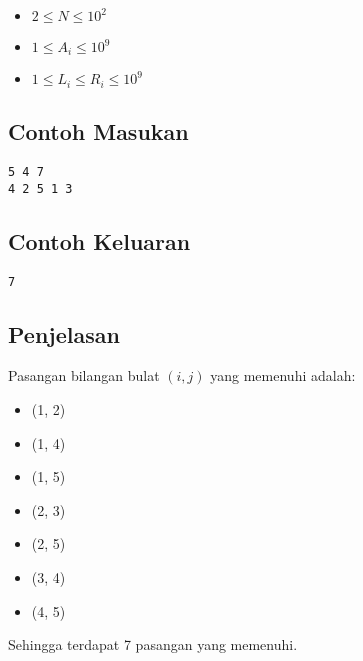 \documentclass{article}
\begin{document}
\begin{itemize}
    \item{$2 \leq N \leq 10^2$}
    \item{$1 \leq A_i \leq 10^9$}
    \item{$1 \leq L_i \leq R_i \leq 10^9$}
\end{itemize}

\begin{multicols}{2}
\subsection*{Contoh Masukan}
\begin{lstlisting}
5 4 7
4 2 5 1 3
\end{lstlisting}
\columnbreak
\subsection*{Contoh Keluaran}
\begin{lstlisting}
7
\end{lstlisting}
\vfill
\null
\end{multicols}

\subsection*{Penjelasan}

Pasangan bilangan bulat $(i, j)$ yang memenuhi adalah:
\begin{itemize}
    \item{(1, 2)}
    \item{(1, 4)}
    \item{(1, 5)}
    \item{(2, 3)}
    \item{(2, 5)}
    \item{(3, 4)}
    \item{(4, 5)}
\end{itemize}

Sehingga terdapat 7 pasangan yang memenuhi.
\end{document}
